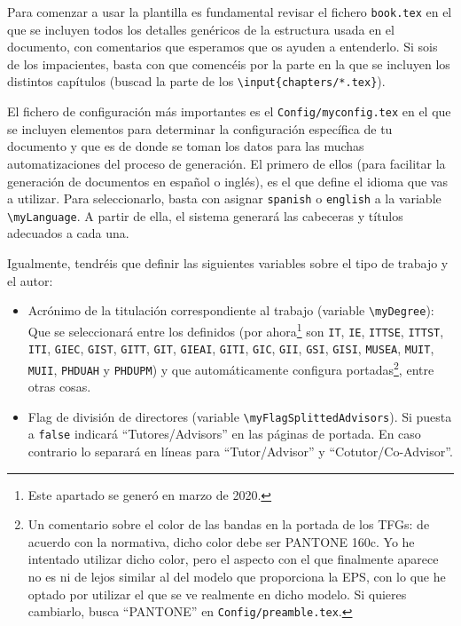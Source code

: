 {  Para comenzar a usar la plantilla es fundamental revisar el fichero \texttt{book.tex} en el que se incluyen todos los detalles genéricos de la estructura usada en el documento, con comentarios que esperamos que os ayuden a entenderlo. Si sois de los impacientes, basta con que comencéis por la parte en la que se incluyen los distintos capítulos (buscad la parte de los \texttt{\textbackslash{}input\{chapters/*.tex\}}).

  El fichero de configuración más importantes es el \texttt{Config/myconfig.tex} en el que se incluyen elementos para determinar la configuración específica de tu documento y que es de donde se toman los datos para las muchas automatizaciones del proceso de generación. El primero de ellos (para facilitar la generación de documentos en español o inglés), es el que define el idioma que vas a utilizar. Para seleccionarlo, basta con asignar \texttt{spanish} o \texttt{english} a la variable \texttt{\textbackslash{}myLanguage}. A partir de ella, el sistema generará las cabeceras y títulos adecuados a cada una.

  Igualmente, tendréis que definir las siguientes variables sobre el tipo de trabajo y el autor:

  \begin{itemize}
    \item Acrónimo de la titulación correspondiente al trabajo (variable \texttt{\textbackslash{}myDegree}): Que se seleccionará entre los definidos (por ahora\footnote{Este apartado se generó en marzo de 2020.} son \texttt{IT}, \texttt{IE}, \texttt{ITTSE}, \texttt{ITTST}, \texttt{ITI}, \texttt{GIEC}, \texttt{GIST}, \texttt{GITT}, \texttt{GIT}, \texttt{GIEAI}, \texttt{GITI}, \texttt{GIC}, \texttt{GII}, \texttt{GSI}, \texttt{GISI}, \texttt{MUSEA}, \texttt{MUIT}, \texttt{MUII}, \texttt{PHDUAH} y \texttt{PHDUPM}) y que automáticamente configura portadas\footnote{Un comentario sobre el color de las bandas en la portada de los TFGs: de acuerdo con la normativa, dicho color debe ser PANTONE 160c. Yo he intentado utilizar dicho color, pero el aspecto con el que finalmente aparece no es ni de lejos similar al del modelo que proporciona la EPS, con lo que he optado por utilizar el que se ve realmente en dicho modelo. Si quieres cambiarlo, busca ``PANTONE'' en \texttt{Config/preamble.tex}.}, entre otras cosas.

    \item Flag de división de directores (variable \texttt{\textbackslash{}myFlagSplittedAdvisors}). Si puesta a \texttt{false} indicará ``Tutores/Advisors'' en las páginas de portada. En caso contrario lo separará en líneas para ``Tutor/Advisor'' y ``Cotutor/Co-Advisor''.


\end{itemize}}
